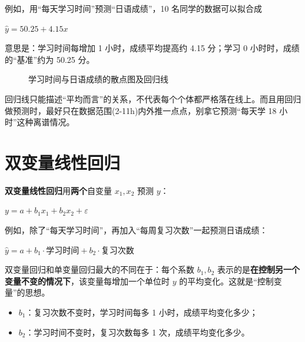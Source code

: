\documentclass[lang=cn,10pt]{elegantbook}
\begin{document}
例如，用“每天学习时间”预测“日语成绩”，10 名同学的数据可以拟合成
\begin{center}
$\hat{y}=50.25+4.15x$
\end{center}
意思是：学习时间每增加 1 小时，成绩平均提高约 4.15 分；学习 0 小时时，成绩的“基准”约为 50.25 分。

\begin{figure}[H]
  \centering
  \caption{学习时间与日语成绩的散点图及回归线}
\end{figure}

\begin{remark}
回归线只能描述“平均而言”的关系，不代表每个个体都严格落在线上。而且用回归做预测时，最好只在数据范围(2-11h)内外推一点点，别拿它预测“每天学 18 小时”这种离谱情况。
\end{remark}



\section{双变量线性回归}
\textbf{双变量线性回归}用\textbf{两个}自变量 $x_1,x_2$ 预测 $y$：
\begin{center}
$y=a+b_1x_1+b_2x_2+\varepsilon$
\end{center}

例如，除了“每天学习时间”，再加入“每周复习次数”一起预测日语成绩：
\begin{center}
$\hat{y}=a+b_1\cdot\text{学习时间}+b_2\cdot\text{复习次数}$
\end{center}

双变量回归和单变量回归最大的不同在于：每个系数 $b_1,b_2$ 表示的是\textbf{在控制另一个变量不变的情况下}，该变量每增加一个单位时 $y$ 的平均变化。这就是“控制变量”的思想。

\begin{itemize}
  \item $b_1$：复习次数不变时，学习时间每多 1 小时，成绩平均变化多少；
  \item $b_2$：学习时间不变时，复习次数每多 1 次，成绩平均变化多少。
\end{itemize}
\end{document}
